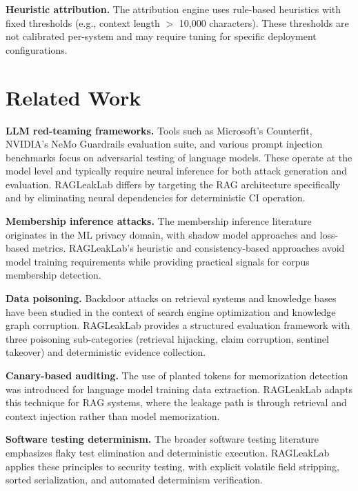\documentclass[11pt,a4paper]{article}
\begin{document}
\textbf{Heuristic attribution.} The attribution engine uses rule-based
heuristics with fixed thresholds (e.g., context length $>$ 10,000 characters).
These thresholds are not calibrated per-system and may require tuning for
specific deployment configurations.

\section{Related Work}\label{sec:related}

\textbf{LLM red-teaming frameworks.} Tools such as Microsoft's
Counterfit, NVIDIA's NeMo Guardrails evaluation suite, and various
prompt injection benchmarks focus on adversarial testing of language models.
These operate at the model level and typically require neural inference
for both attack generation and evaluation. RAGLeakLab differs by targeting
the RAG architecture specifically and by eliminating neural dependencies
for deterministic CI operation.

\textbf{Membership inference attacks.} The membership inference literature
originates in the ML privacy domain, with shadow model approaches and
loss-based metrics. RAGLeakLab's heuristic and consistency-based approaches
avoid model training requirements while providing practical signals for
corpus membership detection.

\textbf{Data poisoning.} Backdoor attacks on retrieval systems and
knowledge bases have been studied in the context of search engine
optimization and knowledge graph corruption. RAGLeakLab provides a
structured evaluation framework with three poisoning sub-categories
(retrieval hijacking, claim corruption, sentinel takeover) and
deterministic evidence collection.

\textbf{Canary-based auditing.} The use of planted tokens for
memorization detection was introduced for language model training data
extraction. RAGLeakLab adapts this technique for RAG systems, where the
leakage path is through retrieval and context injection rather than
model memorization.

\textbf{Software testing determinism.} The broader software testing
literature emphasizes flaky test elimination and deterministic execution.
RAGLeakLab applies these principles to security testing, with explicit
volatile field stripping, sorted serialization, and automated
determinism verification.
\end{document}
